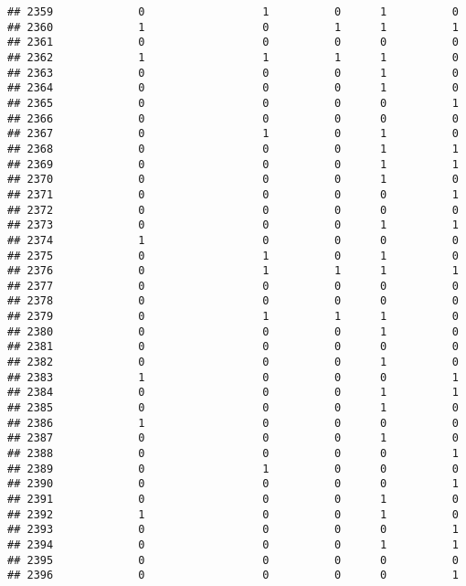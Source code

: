 \documentclass[
]{article}
\begin{document}
\begin{verbatim}
## 2359             0                  1          0      1          0
## 2360             1                  0          1      1          1
## 2361             0                  0          0      0          0
## 2362             1                  1          1      1          0
## 2363             0                  0          0      1          0
## 2364             0                  0          0      1          0
## 2365             0                  0          0      0          1
## 2366             0                  0          0      0          0
## 2367             0                  1          0      1          0
## 2368             0                  0          0      1          1
## 2369             0                  0          0      1          1
## 2370             0                  0          0      1          0
## 2371             0                  0          0      0          1
## 2372             0                  0          0      0          0
## 2373             0                  0          0      1          1
## 2374             1                  0          0      0          0
## 2375             0                  1          0      1          0
## 2376             0                  1          1      1          1
## 2377             0                  0          0      0          0
## 2378             0                  0          0      0          0
## 2379             0                  1          1      1          0
## 2380             0                  0          0      1          0
## 2381             0                  0          0      0          0
## 2382             0                  0          0      1          0
## 2383             1                  0          0      0          1
## 2384             0                  0          0      1          1
## 2385             0                  0          0      1          0
## 2386             1                  0          0      0          0
## 2387             0                  0          0      1          0
## 2388             0                  0          0      0          1
## 2389             0                  1          0      0          0
## 2390             0                  0          0      0          1
## 2391             0                  0          0      1          0
## 2392             1                  0          0      1          0
## 2393             0                  0          0      0          1
## 2394             0                  0          0      1          1
## 2395             0                  0          0      0          0
## 2396             0                  0          0      0          1

\end{verbatim}
\end{document}
